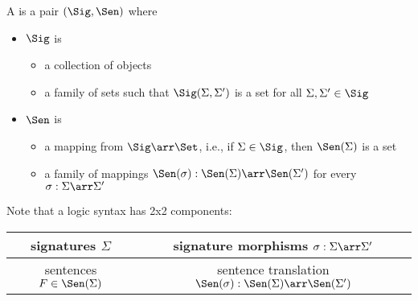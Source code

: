 \begin{definition}\label{def:syn:absmor}
A  is a pair $(\Sig,\Sen)$ where
\begin{itemize}
  \item $\Sig$ is
    \begin{itemize}
      \item a collection of objects \\
      \item a family of sets such that $\Sig(\Sigma,\Sigma')$ is a set for all $\Sigma,\Sigma'\in\Sig$ \\
    \end{itemize}
  \item $\Sen$ is
    \begin{itemize}
      \item a mapping from $\Sig\arr\Set$, i.e., if $\Sigma\in\Sig$, then $\Sen(\Sigma)$ is a set \\
      \item a family of mappings $\Sen(\sigma):\Sen(\Sigma)\arr\Sen(\Sigma')$ for every $\sigma:\Sigma\arr\Sigma'$ \\
    \end{itemize}
\end{itemize}
\end{definition}

\begin{remark}
Note that a logic syntax has 2x2 components:
\begin{center}
\begin{tabular}{|c|c|}
\hline
signatures $\Sigma$ & signature morphisms $\sigma:\Sigma\arr\Sigma'$\\
\hline
sentences $F\in\Sen(\Sigma)$  & sentence translation $\Sen(\sigma):\Sen(\Sigma)\arr\Sen(\Sigma')$ \\
\hline
\end{tabular}
\end{center}
\end{remark}

